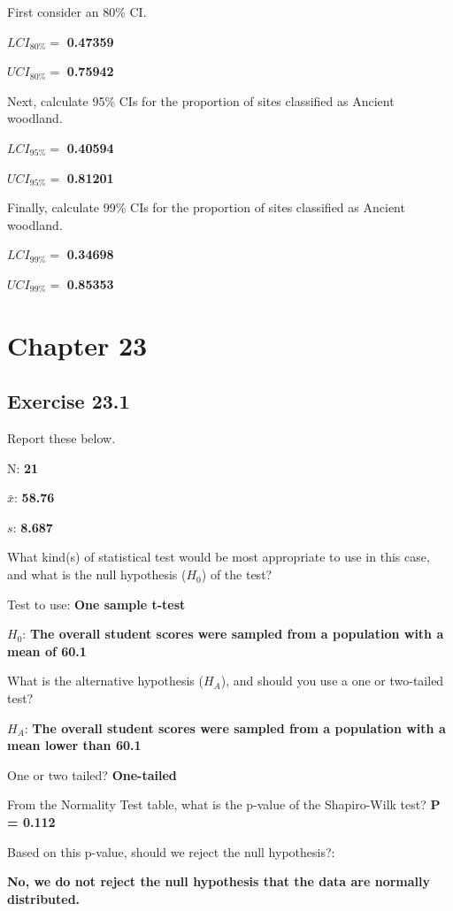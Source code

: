 \documentclass[
  openany]{krantz}
\begin{document}
First consider an 80\% CI.

\(LCI_{80\%} =\) \textbf{0.47359}

\(UCI_{80\%} =\) \textbf{0.75942}

Next, calculate 95\% CIs for the proportion of sites classified as Ancient woodland.

\(LCI_{95\%} =\) \textbf{0.40594}

\(UCI_{95\%} =\) \textbf{0.81201}

Finally, calculate 99\% CIs for the proportion of sites classified as Ancient woodland.

\(LCI_{99\%} =\) \textbf{0.34698}

\(UCI_{99\%} =\) \textbf{0.85353}

\hypertarget{chapter-23}{%
\section{Chapter 23}\label{chapter-23}}

\hypertarget{exercise-23.1}{%
\subsection{Exercise 23.1}\label{exercise-23.1}}

Report these below.

N: \textbf{21}

\(\bar{x}\): \textbf{58.76}

\(s\): \textbf{8.687}

What kind(s) of statistical test would be most appropriate to use in this case, and what is the null hypothesis (\(H_{0}\)) of the test?

Test to use: \textbf{One sample t-test}

\(H_{0}\): \textbf{The overall student scores were sampled from a population with a mean of 60.1}

What is the alternative hypothesis (\(H_{A}\)), and should you use a one or two-tailed test?

\(H_{A}\): \textbf{The overall student scores were sampled from a population with a mean lower than 60.1}

One or two tailed? \textbf{One-tailed}

From the Normality Test table, what is the p-value of the Shapiro-Wilk test? \textbf{P = 0.112}

Based on this p-value, should we reject the null hypothesis?:

\textbf{No, we do not reject the null hypothesis that the data are normally distributed.}
\end{document}
